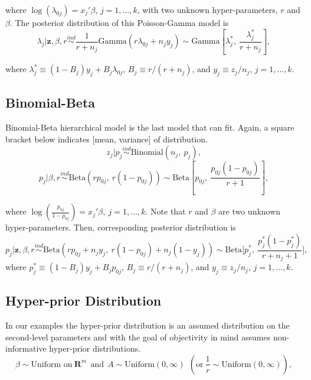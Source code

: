 \documentclass[article]{jss}
\begin{document}
where $\log(\lambda_{0j}) =x_{j}'\beta$, $j=1, \ldots, k$, with two unknown hyper-parameters, $r$ and $\beta$. The posterior distribution of this Poisson-Gamma model is
\begin{equation} \label{gammapost}
\lambda_{j}\vert \textbf{z}, \beta, r \stackrel{ind}{\sim}\frac{1}{r + n_{j}}\textrm{Gamma}(r\lambda_{0j} + n_{j}y_{j})\sim\textrm{Gamma} \left[\lambda^{\ast}_{j},~\frac{\lambda^{\ast}_{j}}{r+n_{j}} \right],
\end{equation}

where $\lambda^{\ast}_{j} \equiv (1-B_{j})y_{j} + B_{j}\lambda_{0j}$,  $B_{j}\equiv r / (r+n_{j})$, and $y_{j}\equiv z_{j} / n_{j}$, $j=1, \ldots, k$. 

\subsection[Binomial-Beta]{Binomial-Beta}
Binomial-Beta hierarchical model is the last model that  can fit. Again, a square bracket below indicates [mean, variance] of distribution.
\begin{equation}
z_{j} \vert p_{j}\stackrel{ind}{\sim}\textrm{Binomial}(n_{j}, ~p_{j}),
\end{equation}
\begin{equation}
p_{j} \vert \beta, r\stackrel{ind}{\sim}\textrm{Beta}(rp_{0j},~ r(1-p_{0j}))\sim \textrm{Beta} \left[p_{0j}, ~\frac{p_{0j}(1-p_{0j})}{r + 1} \right],
\end{equation}

where $\log(\frac{p_{0j}}{1-p_{0j}}) =x_{j}'\beta, ~j=1, \ldots, k$. Note that $r$ and $\beta$ are two unknown hyper-parameters. Then, corresponding posterior distribution is
\begin{equation} \label{betapost}
p_{j}\vert \textbf{z}, \beta, r \stackrel{ind}{\sim}\textrm{Beta}(rp_{0j}+n_{j}y_{j},~r(1-p_{0j})+n_{j}(1-y_{j}))\sim\textrm{Beta}\bigg[p^{\ast}_{j},~ \frac{p^{\ast}_{j}(1-p^{\ast}_{j})}{r+n_{j}+1}\bigg],
\end{equation}
where $p^{\ast}_{j}\equiv(1-B_{j})y_{j}+B_{j}p_{0j}$, $B_{j}\equiv r/ (r+n_{j})$, and $y_{j}\equiv z_{j} / n_{j}$, $j=1,\ldots,k$.


\subsection[Hyper-prior Distribution]{Hyper-prior Distribution}
In our examples the hyper-prior distribution is an assumed distribution on the second-level parameters and with the goal of objectivity in mind  assumes non-informative hyper-prior distributions.
\begin{equation}
\beta \sim \textrm{Uniform on}~ \mathbf{R}^{m}~~\textrm{and}~~A \sim \textrm{Uniform}(0, \infty) ~~(\textrm{or} ~\frac{1}{r}\sim \textrm{Uniform}(0, \infty)),
\end{equation}
\end{document}

